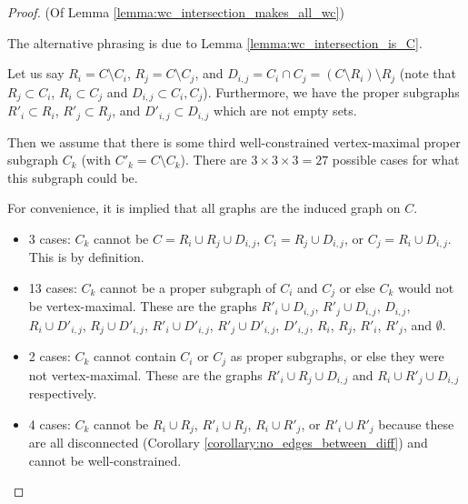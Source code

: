 \begin{proof} (Of Lemma \ref{lemma:wc_intersection_makes_all_wc})

The alternative phrasing is due to Lemma \ref{lemma:wc_intersection_is_C}.

Let us say $R_i=C\setminus C_i$, $R_j=C\setminus C_j$, and $D_{i,j}=C_i\cap C_j=(C\setminus R_i)\setminus R_j$ (note that $R_j\subset C_i$, $R_i\subset C_j$ and $D_{i,j}\subset C_i,C_j$). Furthermore, we have the proper subgraphs $R'_i\subset R_i$, $R'_j\subset R_j$, and $D'_{i,j}\subset D_{i,j}$ which are not empty sets.

Then we assume that there is some third well-constrained vertex-maximal proper subgraph $C_k$ (with $C'_k=C\setminus C_k$). There are $3\times 3\times 3 = 27$ possible cases for what this subgraph could be.

For convenience, it is implied that all graphs are the induced graph on $C$.
\newcommand{\inducedOnC}[1]{#1}


\begin{itemize}
    \item 3 cases: $C_k$ cannot be $C=\inducedOnC{R_i\cup R_j\cup D_{i,j}}$, $C_i=\inducedOnC{R_j\cup D_{i,j}}$, or $C_j=\inducedOnC{R_i\cup D_{i,j}}$. This is by definition.

    \item 13 cases: $C_k$ cannot be a proper subgraph of $C_i$ and $C_j$ or else $C_k$ would not be vertex-maximal. These are the graphs $\inducedOnC{R'_i\cup D_{i,j}}$, $\inducedOnC{R'_j\cup D_{i,j}}$, $\inducedOnC{ D_{i,j}}$, $\inducedOnC{R_i\cup D'_{i,j}}$, $\inducedOnC{R_j\cup D'_{i,j}}$, $\inducedOnC{R'_i\cup D'_{i,j}}$, $\inducedOnC{R'_j\cup D'_{i,j}}$, $\inducedOnC{ D'_{i,j}}$, $\inducedOnC{R_i}$, $\inducedOnC{R_j}$, $\inducedOnC{R'_i}$, $\inducedOnC{R'_j}$, and $\inducedOnC{\emptyset}$.

    \item 2 cases: $C_k$ cannot contain $C_i$ or $C_j$ as proper subgraphs, or else they were not vertex-maximal. These are the graphs $\inducedOnC{R'_i\cup R_j\cup D_{i,j}}$ and $\inducedOnC{R_i\cup R'_j\cup D_{i,j}}$ respectively.

    \item 4 cases: \usestwod $C_k$ cannot be $\inducedOnC{R_i\cup R_j}$, $\inducedOnC{R'_i\cup R_j}$, $\inducedOnC{R_i\cup R'_j}$, or $\inducedOnC{R'_i\cup R'_j}$ because these are all disconnected (Corollary \ref{corollary:no_edges_between_diff}) and cannot be well-constrained.


\end{itemize}
\end{proof}
